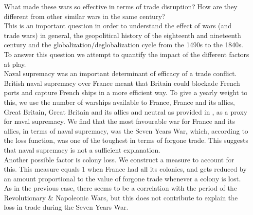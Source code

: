 \documentclass[12pt,a4paper,notitlepage]{article}
\begin{document}
What made these wars so effective in terms of trade disruption?
How are they different from other similar wars in the same century? \\
This is an important question in order to understand the effect of wars (and trade wars) in general, the geopolitical history of the eighteenth and nineteenth century and the globalization/deglobalization cycle from the 1490s to the 1840s. \\
To answer this question we attempt to quantify the impact of the different factors at play. \\
Naval supremacy was an important determinant of efficacy of a trade conflict.
British naval supremacy over France meant that Britain could blockade French ports and capture French ships in a more efficient way.
To give a yearly weight to this, we use the number of warships available to France, France and its allies, Great Britain, Great Britain and its allies and neutral as provided in \cite{modelski1988seapower}, as a proxy for naval supremacy.
We find that the most favourable war for France and its allies, in terms of naval supremacy, was the Seven Years War, which, according to the loss function, was one of the toughest in terms of forgone trade.
This suggests that naval supremacy is not a sufficient explanation. \\ 
Another possible factor is colony loss. We construct a measure to account for this.
This measure equals 1 when France had all its colonies, and gets reduced by an amount proportional to the value of forgone trade whenever a colony is lost.
As in the previous case, there seems to be a correlation with the period of the Revolutionary \& Napoleonic Wars, but this does not contribute to explain the loss in trade during the Seven Years War. \\
\end{document}
